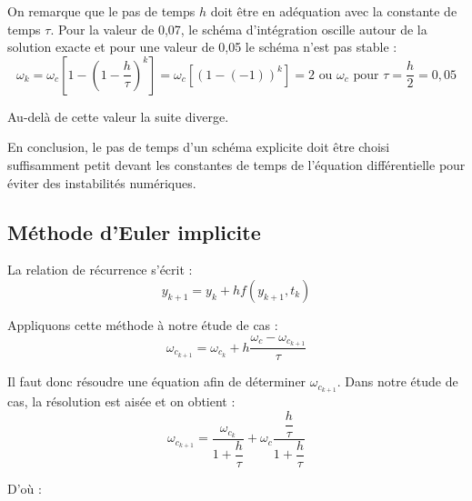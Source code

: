\documentclass[10pt]{article}
\begin{document}
On remarque que le pas de temps $h$ doit être en adéquation avec la constante de temps $\tau$. Pour la valeur de 0,07, le schéma d’intégration oscille autour de la solution exacte et pour une valeur de 0,05 le schéma n’est pas stable :
$$\omega_k=\omega_c\left[1-\left(1-\dfrac{h}{\tau}\right)^k \right]=\omega_c[(1-(-1))^k ]=2\text{ ou }\omega_c \text{ pour } \tau=\dfrac{h}{2}=0,05 $$

Au-delà de  cette valeur la suite diverge.

En conclusion, le pas de temps d’un schéma explicite doit être choisi suffisamment petit devant les constantes de temps de l’équation différentielle pour éviter des instabilités numériques.

\subsection{Méthode d'Euler implicite}
\begin{resultat}
La relation de récurrence s’écrit : 
$$y_{k+1}=y_k+hf(y_{k+1},t_k)$$
\end{resultat}

Appliquons cette méthode à notre étude de cas :
$$\omega_{c_{k+1}}=\omega_{c_k}+h \dfrac{\omega_c-\omega_{c_{k+1}}}{\tau}$$

Il faut donc résoudre une équation afin de déterminer $\omega_{c_{k+1}}$. Dans notre étude de cas, la résolution est aisée et on obtient :
$$\omega_{c_{k+1}}=\dfrac{\omega_{c_k}}{1+\dfrac{h}{\tau}}+\omega_c \dfrac{\dfrac{h}{\tau}}{1+\dfrac{h}{\tau}}$$

D’où :
\end{document}
